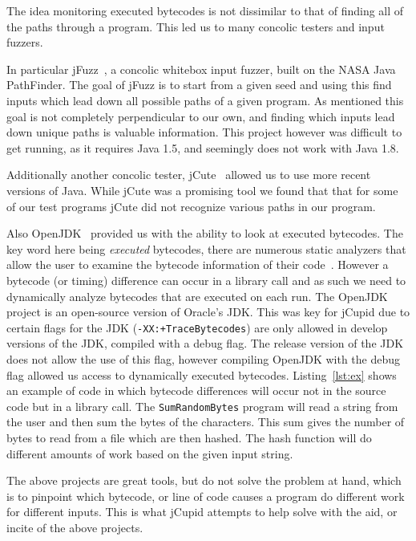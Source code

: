 The idea monitoring executed bytecodes is not dissimilar to that of finding all of the paths through a program. This led us to many concolic testers and input fuzzers. 

In particular jFuzz~\cite{jayaraman2009jfuzz}, a concolic whitebox input fuzzer, built on the NASA Java PathFinder. The goal of jFuzz is to start from a given seed and using this find inputs which lead down all possible paths of a given program. As mentioned this goal is not completely perpendicular to our own, and finding which inputs lead down unique paths is valuable information. This project however was difficult to get running, as it requires Java 1.5, and seemingly does not work with Java 1.8.

Additionally another concolic tester, jCute~\cite{conf/cav/SenA06} allowed us to use more recent versions of Java. While jCute was a promising tool we found that that for some of our test programs jCute did not recognize various paths in our program.

Also OpenJDK~\cite{OpenJDK} provided us with the ability to look at executed bytecodes. The key word here being \emph{executed} bytecodes, there are numerous static analyzers that allow the user to examine the bytecode information of their code~\cite{vallee1999soot}. However a bytecode (or timing) difference can occur in a library call and as such we need to dynamically analyze bytecodes that are executed on each run. The OpenJDK project is an open-source version of Oracle's JDK. This was key for jCupid due to certain flags for the JDK (\texttt{-XX:+TraceBytecodes}) are only allowed in develop versions of the JDK, compiled with a debug flag. The release version of the JDK does not allow the use of this flag, however compiling OpenJDK with the debug flag allowed us access to dynamically executed bytecodes. Listing~\ref{lst:ex} shows an example of code in which bytecode differences will occur not in the source code but in a library call. The \texttt{SumRandomBytes} program will read a string from the user and then sum the bytes of the characters. This sum gives the number of bytes to read from a file which are then hashed. The hash function will do different amounts of work based on the given input string.

The above projects are great tools, but do not solve the problem at hand, which is to pinpoint which bytecode, or line of code causes a program do different work for different inputs. This is what jCupid attempts to help solve with the aid, or incite of the above projects.

